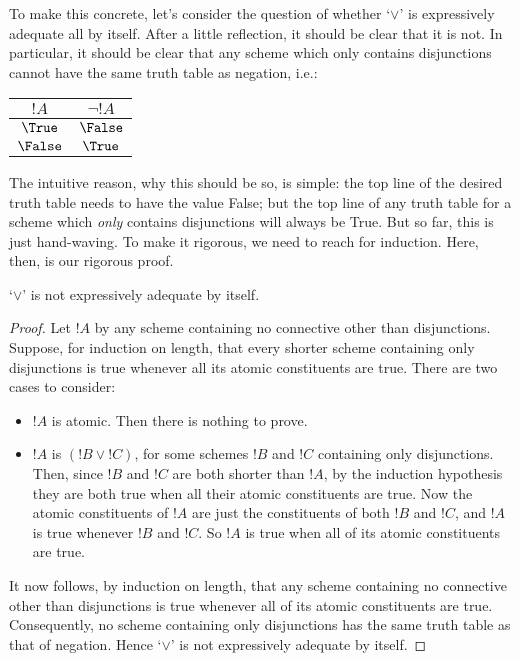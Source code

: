 \documentclass[../../../include/open-logic-section]{subfiles}
\begin{document}
 To make this concrete, let's consider the question of whether `$\lor$' is expressively adequate all by itself. After a little reflection, it should be clear that it is not. In particular, it should be clear that any scheme which only contains disjunctions cannot have the same truth table as negation, i.e.:
				\begin{center}
				\begin{tabular}{c | c}
				${!A}$ & $\lnot {!A}$\\
				\hline
				 $\True$  & $\False$ \\
				 $\False$ & $\True$ 
				\end{tabular}
				\end{center}
The intuitive reason, why this should be so, is simple: the top line of the desired truth table needs to have the value False; but the top line of any truth table for a scheme which \emph{only} contains disjunctions will always be True. But so far, this is just hand-waving. To make it rigorous, we need to reach for induction. Here, then, is our rigorous proof.
 	\begin{prop}
		`$\lor$' is not expressively adequate by itself.
		\begin{proof}
			Let ${!A}$ by any scheme containing no connective other than disjunctions. Suppose, for induction on length, that every shorter scheme containing only disjunctions is true whenever all its atomic constituents are true. There are two cases to consider:
				\begin{itemize}
					\item ${!A}$ is atomic. Then there is nothing to prove.
					\item ${!A}$ is $({!B} \lor {!C})$, for some schemes ${!B}$ and ${!C}$ containing only disjunctions. Then, since ${!B}$ and ${!C}$ are both shorter than ${!A}$, by the induction hypothesis they are both true when all their atomic constituents are true. Now the atomic constituents of ${!A}$ are just the constituents of both ${!B}$ and ${!C}$, and ${!A}$ is true whenever ${!B}$ and ${!C}$. So ${!A}$ is true when all of its atomic constituents are true.
				\end{itemize}
			It now follows, by induction on length, that any scheme containing no connective other than disjunctions is true whenever all of its atomic constituents are true. Consequently, no scheme containing only disjunctions has the same truth table as that of negation. Hence `$\lor$' is not expressively adequate by itself.
		\end{proof}
	\end{prop}\noindent
\end{document}
